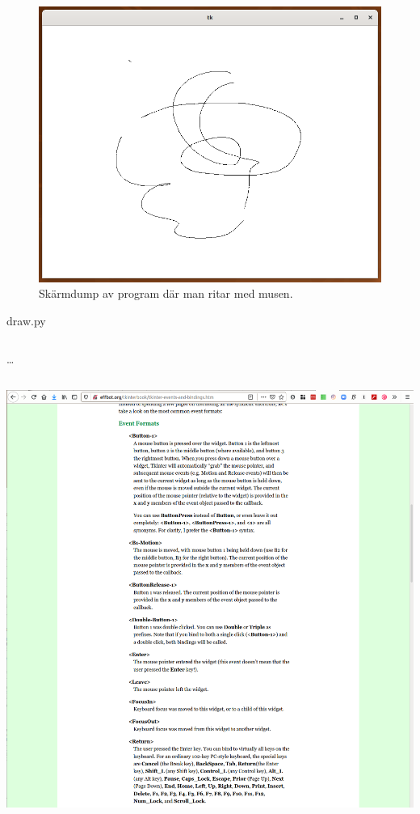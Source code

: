 \begin{frame}
  \begin{figure}
    \includegraphics[height=0.5\textheight]{figs/draw.png}
    \caption{Skärmdump av program där man ritar med musen.}
  \end{figure}
\end{frame}

\begin{frame}[fragile]
  draw.py \hrulefill
  \inputminted[linenos,firstline=5,lastline=13]{python}{examples/draw.py}
  \dots
  \inputminted[autogobble=false,linenos,firstline=18,lastline=22]{python}{examples/draw.py}
\end{frame}

\begin{frame}
  \href{http://effbot.org/tkinterbook/tkinter-events-and-bindings.htm}{%
    \includegraphics[width=\columnwidth]{figs/docs-events.png}
  }
\end{frame}

